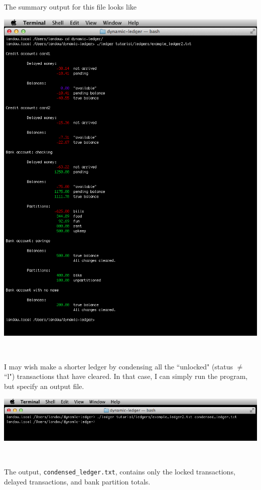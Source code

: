 \documentclass{article}
\providecommand{\q}{$\quad$ \newline}
\begin{document}
\begin{flushleft}
The summary output for this file looks like

\begin{center}
\includegraphics[scale=.5]{fig/sum1.png}
\end{center} \q



I may wish make a shorter ledger by condensing all the ``unlocked" (status $\ne$ ``l") transactions that have cleared.  In that case, I can simply run the program, but specify an output file. \q


\begin{center}
\includegraphics[scale=.5]{fig/condense.png}
\end{center} \q

The output, {\tt condensed\_ledger.txt}, contains only the locked transactions, delayed transactions, and bank partition totals. \q


\end{flushleft}
\end{document}
